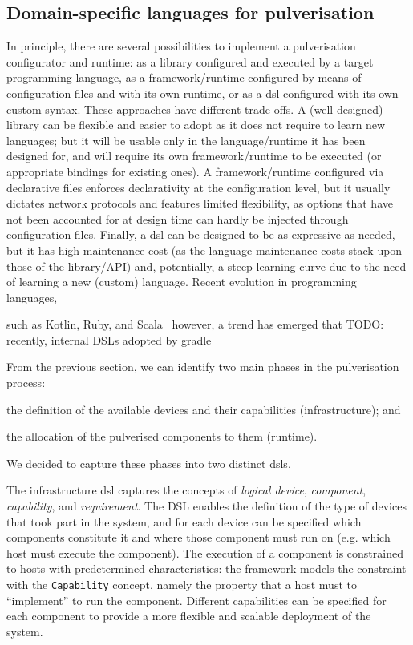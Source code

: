 \documentclass[conference]{IEEEtran}
\begin{document}
\subsection{Domain-specific languages for pulverisation}

In principle, there are several possibilities to implement a pulverisation configurator and runtime:
as a library
configured and executed by a target programming language,
as a framework/runtime configured by means of configuration files and with its own runtime,
or as a \ac{dsl} configured with its own custom syntax.
%
These approaches have different trade-offs.
%
A (well designed) library can be flexible and easier to adopt
as it does not require to learn new languages;
but it will be usable only in the language/runtime it has been designed for,
and will require its own framework/runtime to be executed
(or appropriate bindings for existing ones).
%
A framework/runtime configured via declarative files enforces declarativity at the configuration level,
but it usually dictates network protocols and features limited flexibility,
as options that have not been accounted for at design time can hardly be injected through configuration files.
%
Finally, a \ac{dsl} can be designed to be as expressive as needed,
but it has high maintenance cost (as the language maintenance costs stack upon those of the library/API) and, potentially,
a steep learning curve due to the need of learning a new (custom) language.
%
Recent evolution in programming languages,

such as Kotlin, Ruby, and Scala~\cite{Riti2018}
however,
a trend has emerged that
TODO: recently, internal DSLs
adopted by gradle

From the previous section,
we can identify two main phases in the pulverisation process:
\begin{enumerate*}[label=\it{(\roman*)}]
  \item the definition of the available devices and their capabilities (infrastructure); and
  \item the allocation of the pulverised components to them (runtime).
\end{enumerate*}
%
We decided to capture these phases into two distinct \acp{dsl}.

The infrastructure \ac{dsl} captures the concepts of
\emph{logical device}, \emph{component}, \emph{capability}, and \emph{requirement}.
%
The DSL enables the definition of the type of devices that took part in the system,
and for each device can be specified which components constitute it and where those component must run on (e.g. which host must execute the component).
%
The execution of a component is constrained to hosts with predetermined characteristics:
the framework models the constraint with the \texttt{Capability} concept,
namely the property that a host must to ``implement'' to run the component.
%
Different capabilities can be specified for each component to provide a more flexible and scalable deployment of the system.
\end{document}
